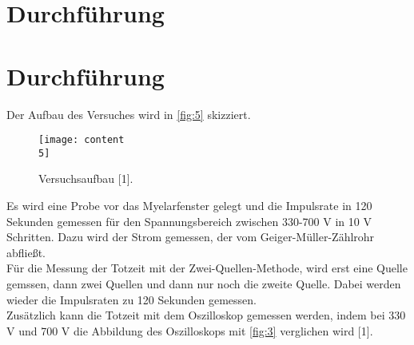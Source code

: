 \section{Durchführung}
\label{sec:Durchführung}

\section{Durchführung}
Der Aufbau des Versuches wird in \autoref{fig:5} skizziert.
\begin{figure}[H] 
  \centering 
  \texttt{[image: content\\5]} 
  \caption{Versuchsaufbau [1].} 
  \label{fig:5} 
\end{figure}
Es wird eine Probe vor das Myelarfenster gelegt und die Impulsrate in 120 Sekunden gemessen für den Spannungsbereich zwischen 330-700 V in 10 V Schritten. Dazu wird der Strom gemessen, der vom Geiger-Müller-Zählrohr abfließt.\\
Für die Messung der Totzeit mit der Zwei-Quellen-Methode, wird erst eine Quelle gemssen, dann zwei Quellen und dann nur noch die zweite Quelle. Dabei werden wieder die Impulsraten zu 120 Sekunden gemessen.\\
Zusätzlich kann die Totzeit mit dem Oszilloskop gemessen werden, indem bei 330 V und 700 V die Abbildung des Oszilloskops mit \autoref{fig:3} verglichen wird [1]. 
